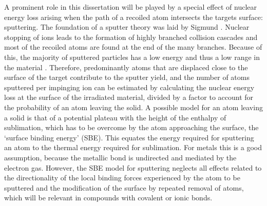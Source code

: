 A prominent role in this dissertation will be played by a special effect of nuclear energy loss arising when the path of a recoiled atom intersects the targets surface: sputtering. The foundation of a sputter theory was laid by Sigmund \cite{sigmund_theory_1969}. Nuclear stopping of ions leads to the formation of highly branched collision cascades and most of the recoiled atoms are found at the end of the many branches. Because of this, the majority of sputtered particles has a low energy and thus a low range in the material \cite{thompson_energy_1968}. Therefore, predominantly atoms that are displaced close to the surface of the target contribute to the sputter yield, and the number of atoms sputtered per impinging ion can be estimated by calculating the nuclear energy loss at the surface of the irradiated material, divided by a factor to account for the probability of an atom leaving the solid. A possible model for an atom leaving a solid is that of a potential plateau with the height of the enthalpy of sublimation, which has to be overcome by the atom approaching the surface, the `surface binding energy' (SBE). This equates the energy required for sputtering an atom to the thermal energy required for sublimation. For metals this is a good assumption, because the metallic bond is undirected and mediated by the electron gas. However, the SBE model for sputtering neglects all effects related to the directionality of the local binding forces experienced by the atom to be sputtered and the modification of the surface by repeated removal of atoms, which will be relevant in compounds with covalent or ionic bonds. 


